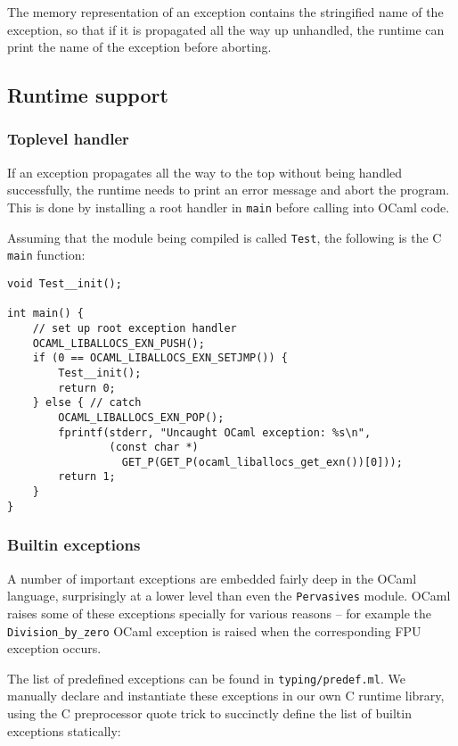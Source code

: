 \documentclass[12pt,a4paper,twoside,openright]{report}
\begin{document}
The memory representation of an exception contains the stringified name of the exception, so that if it is propagated all the way up unhandled, the runtime can print the name of the exception before aborting.

\subsection{Runtime support}

\subsubsection{Toplevel handler}

If an exception propagates all the way to the top without being handled successfully, the runtime needs to print an error message and abort the program. This is done by installing a root handler in \lstinline!main! before calling into OCaml code.

Assuming that the module being compiled is called \lstinline!Test!, the following is the C \lstinline!main! function:

\begin{lstlisting}
void Test__init();

int main() {
    // set up root exception handler
    OCAML_LIBALLOCS_EXN_PUSH();
    if (0 == OCAML_LIBALLOCS_EXN_SETJMP()) {
        Test__init();
        return 0;
    } else { // catch
        OCAML_LIBALLOCS_EXN_POP();
        fprintf(stderr, "Uncaught OCaml exception: %s\n",
                (const char *)
                  GET_P(GET_P(ocaml_liballocs_get_exn())[0]));
        return 1;
    }
}
\end{lstlisting}

\subsubsection{Builtin exceptions}

A number of important exceptions are embedded fairly deep in the OCaml language, surprisingly at a lower level than even the \lstinline!Pervasives! module. OCaml raises some of these exceptions specially for various reasons -- for example the \lstinline!Division_by_zero! OCaml exception is raised when the corresponding FPU exception occurs.

The list of predefined exceptions can be found in \lstinline!typing/predef.ml!. We manually declare and instantiate these exceptions in our own C runtime library, using the C preprocessor quote trick to succinctly define the list of builtin exceptions statically:
\end{document}
